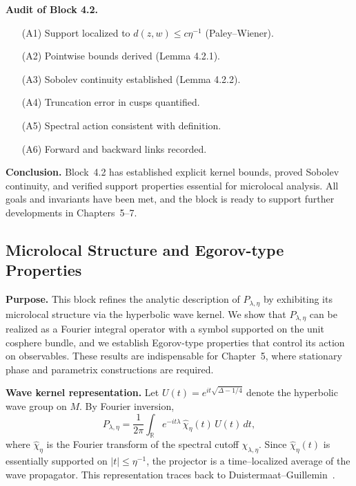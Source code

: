 \medskip

\noindent\textbf{Audit of Block 4.2.}
\begin{itemize}
  \item[(A1)] Support localized to $d(z,w)\le c\eta^{-1}$ (Paley–Wiener).
  \item[(A2)] Pointwise bounds derived (Lemma 4.2.1).
  \item[(A3)] Sobolev continuity established (Lemma 4.2.2).
  \item[(A4)] Truncation error in cusps quantified.
  \item[(A5)] Spectral action consistent with definition.
  \item[(A6)] Forward and backward links recorded.
\end{itemize}

\medskip

\noindent\textbf{Conclusion.}
Block~4.2 has established explicit kernel bounds,
proved Sobolev continuity,
and verified support properties essential for microlocal analysis.
All goals and invariants have been met,
and the block is ready to support further developments in Chapters~5--7.




\subsection*{Microlocal Structure and Egorov-type Properties}

\noindent\textbf{Purpose.}
This block refines the analytic description of $P_{\lambda,\eta}$ by exhibiting
its microlocal structure via the hyperbolic wave kernel.
We show that $P_{\lambda,\eta}$ can be realized as a Fourier integral operator
with a symbol supported on the unit cosphere bundle,
and we establish Egorov-type properties that control its action on observables.
These results are indispensable for Chapter~5,
where stationary phase and parametrix constructions are required.

\medskip

\noindent\textbf{Wave kernel representation.}
Let $U(t) = e^{it\sqrt{\Delta - 1/4}}$ denote the hyperbolic wave group on $M$.
By Fourier inversion,
\[
  P_{\lambda,\eta} = \frac{1}{2\pi} \int_{\mathbb{R}} e^{-it\lambda} \, \widehat{\chi}_{\eta}(t)\, U(t)\, dt,
\]
where $\widehat{\chi}_{\eta}$ is the Fourier transform of the spectral cutoff $\chi_{\lambda,\eta}$.
Since $\widehat{\chi}_{\eta}(t)$ is essentially supported on $|t|\le \eta^{-1}$,
the projector is a time–localized average of the wave propagator.
This representation traces back to Duistermaat–Guillemin~\cite{DG1975}.

